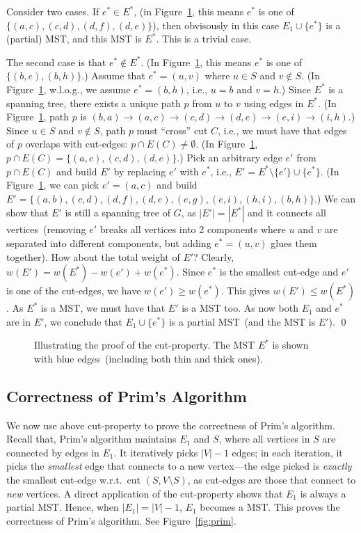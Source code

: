 Consider two cases. If $e^* \in E^*$,
(in Figure~\ref{fig:proof}, this means $e^*$ is one of $\{(a,c),(c,d),(d,f),(d,e)\}$),
then obvisously in this case $E_1\cup \{e^*\}$ is a (partial) MST, and this MST is $E^*$.
This is a trivial case.

The second case is that $e^* \not\in E^*$.
(In Figure~\ref{fig:proof}, this means $e^*$ is one of $\{(b,e),(b,h)\}$.)
Assume that $e^* = (u,v)$ where $u\in S$ and $v\notin S$.
(In Figure~\ref{fig:proof}, w.l.o.g., we assume $e^* = (b,h)$, i.e., $u= b$ and $v=h$.)
Since $E^*$ is a spanning tree, there exists a unique path $p$ from $u$ to $v$ using edges in $E^*$.
(In Figure~\ref{fig:proof}, path $p$ is $(b,a)\to(a,c)\to(c,d)\to(d,e)\to(e,i)\to(i,h)$.)
Since $u\in S$ and $v\notin S$, path $p$ must ``cross'' cut $C$, i.e., 
we must have that edges of $p$ overlaps with cut-edges: $p\cap E(C)\neq \emptyset$.
(In Figure~\ref{fig:proof}, $p\cap E(C) = \{(a,c),(c,d),(d,e)\}$.)
Pick an arbitrary edge $e'$ from $p\cap E(C)$ and build
$E'$ by replacing $e'$ with $e^*$, i.e., $E' = E^* \setminus \{e'\} \cup \{e^*\}$.
(In Figure~\ref{fig:proof}, we can pick $e' = (a,c)$ and build $E' = \{(a,b),(c,d),(d,f),(d,e),(e,g),(e,i),(h,i),(b,h)\}$.)
We can show that $E'$ is still a spanning tree of $G$, as $|E'| = |E^*|$ and it connects all vertices~(removing $e'$ breaks
all vertices into 2 components where $u$ and $v$ are separated into different components, but adding $e^* = (u,v)$ glues them together).
How about the total weight of $E'$? Clearly, $w(E') = w(E^*) - w(e') + w(e^*)$.
Since $e^*$ is the smallest cut-edge and $e'$ is one of the cut-edges, we have $w(e') \ge w(e^*)$.
This gives $w(E') \le w(E^*)$. As $E^*$ is a MST, we must have that $E'$ is a MST too.
As now both $E_1$ and $e^*$ are in $E'$, we conclude that $E_1\cup \{e^*\}$ is a partial MST~(and the MST is $E'$). \qed

\begin{figure}[h]
\centering{}
\caption{Illustrating the proof of the cut-property. The MST $E^*$ is shown with blue edges~(including both thin and thick ones).}
\label{fig:proof}
\end{figure}

\subsection*{Correctness of Prim's Algorithm}


We now use above cut-property to prove the correctness of Prim's algorithm.
Recall that, Prim's algorithm maintains $E_1$ and $S$, where all vertices in $S$ are connected by edges in $E_1$.
It iteratively picks $|V|-1$ edges;
in each iteration, it picks the \emph{smallest} edge that connects to a new vertex---the edge picked
is \emph{exactly} the smallest cut-edge w.r.t.\ cut $(S,V\setminus S)$,
as cut-edges are those that connect to \emph{new} vertices.
A direct application of the cut-property shows that $E_1$ is always a partial MST.
Hence, when $|E_1| = |V|-1$, $E_1$ becomes a MST.
This proves the correctness of Prim's algorithm.
See Figure~\ref{fig:prim}.


